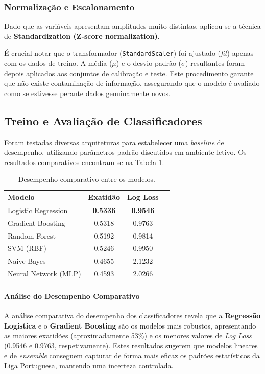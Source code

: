 \documentclass[10pt]{article}
\begin{document}
\subsubsection{Normalização e Escalonamento}
Dado que as variáveis apresentam amplitudes muito distintas, aplicou-se a técnica de \textbf{Standardization (Z-score normalization)}. 

É crucial notar que o transformador (\texttt{StandardScaler}) foi ajustado (\textit{fit}) apenas com os dados de treino. A média ($\mu$) e o desvio padrão ($\sigma$) resultantes foram depois aplicados aos conjuntos de calibração e teste. Este procedimento garante que não existe contaminação de informação, assegurando que o modelo é avaliado como se estivesse perante dados genuinamente novos.

\subsection{Treino e Avaliação de Classificadores}
Foram testadas diversas arquiteturas para estabelecer uma \textit{baseline} de desempenho, utilizando parâmetros padrão discutidos em ambiente letivo. Os resultados comparativos encontram-se na Tabela \ref{tab:comparacao_modelos}.

\begin{table}[H]
\centering
\begin{tabular}{lccc}
\hline
\textbf{Modelo} & \textbf{Exatidão} & \textbf{Log Loss} \\ \hline
Logistic Regression & \textbf{0.5336} & \textbf{0.9546}\\
Gradient Boosting & 0.5318 & 0.9763  \\
Random Forest & 0.5192 & 0.9814 \\
SVM (RBF) & 0.5246 & 0.9950 \\
Naive Bayes & 0.4655 & 2.1232 \\
Neural Network (MLP) & 0.4593 & 2.0266\\ \hline
\end{tabular}
\caption{Desempenho comparativo entre os modelos.}
\label{tab:comparacao_modelos}
\end{table}

\paragraph{Análise do Desempenho Comparativo}
A análise comparativa do desempenho dos classificadores revela que a \textbf{Regressão Logística} e o \textbf{Gradient Boosting} são os modelos mais robustos, apresentando as maiores exatidões (aproximadamente 53\%) e os menores valores de \textit{Log Loss} (0.9546 e 0.9763, respetivamente). Estes resultados sugerem que modelos lineares e de \textit{ensemble} conseguem capturar de forma mais eficaz os padrões estatísticos da Liga Portuguesa, mantendo uma incerteza controlada. 
\end{document}
